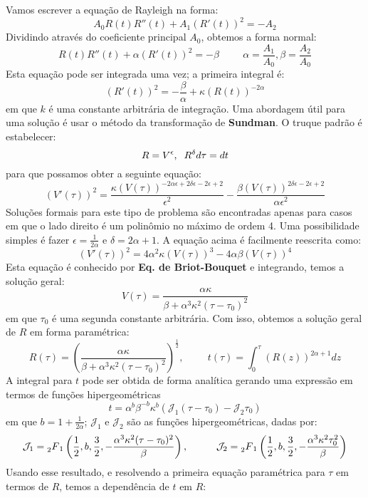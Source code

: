\documentclass[10pt,a4paper]{article}
\begin{document}
	Vamos escrever a equação de Rayleigh na forma: \[A_0R(t)R''(t)+A_1(R'(t))^2 = -A_2\]
	Dividindo através do coeficiente principal $A_0$, obtemos a forma normal: \[R(t)R''(t)+\alpha(R'(t))^2 = -\beta\hspace{1cm}\alpha=\frac{A_1}{A_0},\beta=\frac{A_2}{A_0}\]
	Esta equação pode ser integrada uma vez; a primeira integral é:
	\begin{equation}
		(R'(t))^2 = -\frac{\beta}{\alpha} + \kappa(R(t))^{-2\alpha}
		\label{eq:1}
	\end{equation}
	em que $k$ é uma constante arbitrária de integração. Uma abordagem útil para uma solução é usar o método da transformação de \textbf{Sundman}. O truque padrão é estabelecer:
	\[R = V^\epsilon, \hspace{0.2cm} R^\delta d\tau = dt\]
	para que possamos obter a seguinte equação:
	\[(V'(\tau))^2 = \frac{\kappa(V(\tau))^{-2\alpha\epsilon+2\delta\epsilon-2\epsilon+2}}{\epsilon^2} - \frac{\beta(V(\tau))^{2\delta\epsilon-2\epsilon+2}}{\alpha\epsilon^2}\]
	Soluções formais para este tipo de problema são encontradas apenas para casos em que o lado direito é um polinômio no máximo de ordem 4. Uma possibilidade simples é fazer $\epsilon=\frac{1}{2\alpha}$ e $\delta=2\alpha+1$. A equação acima é facilmente reescrita como:
	\[(V'(\tau))^2 = 4\alpha^2\kappa(V(\tau))^3 - 4\alpha\beta(V(\tau))^4\]
	Esta equação é conhecido por \textbf{Eq. de Briot-Bouquet} e integrando, temos a solução geral:
	\[V(\tau) = \frac{\alpha\kappa}{\beta+\alpha^3\kappa^2(\tau-\tau_0)^2}\]
	em que $\tau_0$ é uma segunda constante arbitrária. Com isso, obtemos a solução geral de $R$ em forma paramétrica:
	\[R(\tau) = \left(\frac{\alpha\kappa}{\beta+\alpha^3\kappa^2(\tau-\tau_0)^2}\right)^{\frac{1}{2}}, \hspace{1cm} t(\tau) = \int_0^\tau{(R(z))^{2\alpha+1} dz}\]
	A integral para $t$ pode ser obtida de forma analítica gerando uma expressão em termos de funções hipergeométricas
	\[t=\alpha^b\beta^{-b}\kappa^b\left(\mathcal{J}_1(\tau-\tau_0) - \mathcal{J}_2\tau_0\right)\]
	em que $b=1+\frac{1}{2\alpha}$; $\mathcal{J}_1$ e $\mathcal{J}_2$ são as funções hipergeométricas, dadas por:
	\[\mathcal{J}_1 = \prescript{}{2}{F}_1\left(\frac{1}{2}, b, \frac{3}{2}, -\frac{\alpha^3\kappa^2(\tau-\tau_0)^2}{\beta}\right), \hspace{1cm} \mathcal{J}_2 = \prescript{}{2}{F}_1\left(\frac{1}{2}, b, \frac{3}{2}, -\frac{\alpha^3\kappa^2\tau_0^2}{\beta}\right)\]
	Usando esse resultado, e resolvendo a primeira equação paramétrica para $\tau$ em termos de $R$, temos a dependência de $t$ em $R$:
\end{document}

